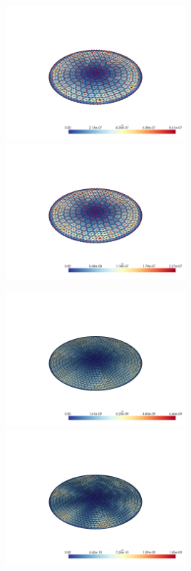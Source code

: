 \documentclass[
  11pt,
]{article}
\let\origfigure\figure
\let\endorigfigure\endfigure
\renewenvironment{figure}[1][2] {
    \expandafter\origfigure\expandafter[H]
} {
    \endorigfigure
}
\begin{document}
\begin{figure}
\caption{Finite element error in the L2 and H1 norms/seminorms, respectively for problem 1 over mesh number 3 using order 13 quadrature.}
\end{figure}

\includegraphics[width=0.5\textwidth,height=\textheight]{../img/mesh3-gauss19-b-L2.png}
\includegraphics[width=0.5\textwidth,height=\textheight]{../img/mesh3-gauss19-b-H1.png}

\begin{figure}
\caption{Finite element error in the L2 and H1 norms/seminorms, respectively for problem 1 over mesh number 3 using order 19 quadrature.}
\end{figure}

\includegraphics[width=0.5\textwidth,height=\textheight]{../img/mesh4-gauss02-b-L2.png}
\includegraphics[width=0.5\textwidth,height=\textheight]{../img/mesh4-gauss02-b-H1.png}
\end{document}
